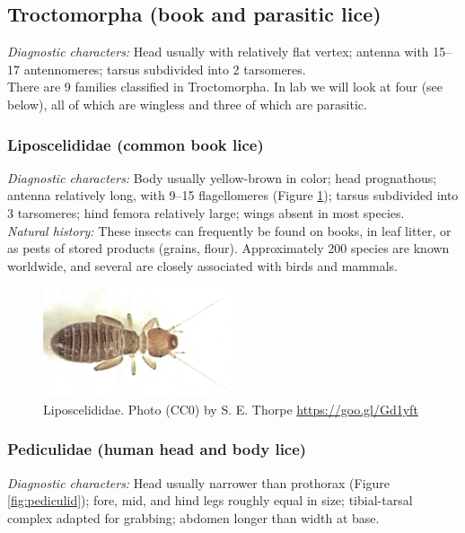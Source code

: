 \documentclass[letterpaper, 11pt]{article}
\begin{document}
\subsection{Troctomorpha (book and parasitic lice)}
\noindent{}\textit{Diagnostic characters:} Head usually with relatively flat vertex; antenna with 15--17 antennomeres; tarsus subdivided into 2 tarsomeres.\\

\noindent{}There are 9 families classified in Troctomorpha. In lab we will look at four (see below), all of which are wingless and three of which are parasitic.

\subsubsection{Liposcelididae (common book lice)}
\noindent{}\textit{Diagnostic characters:} Body usually yellow-brown in color; head prognathous; antenna relatively long, with 9--15 flagellomeres (Figure \ref{fig:liposcelidid}); tarsus subdivided into 3 tarsomeres; hind femora relatively large; wings absent in most species.\\

\noindent{}\textit{Natural history:} These insects can frequently be found on books, in leaf litter, or as pests of stored products (grains, flour). Approximately 200 species are known worldwide, and several are closely associated with birds and mammals.\\

\begin{figure}[ht!]
 \centering
 \includegraphics[width=0.5\textwidth]{LiposcelididHabitus}
 \caption{Liposcelididae. Photo (CC0) by S. E. Thorpe \url{https://goo.gl/Gd1yft}}
 \label{fig:liposcelidid}
\end{figure}

\subsubsection{Pediculidae (human head and body lice)}
\noindent{}\textit{Diagnostic characters:} Head usually narrower than prothorax (Figure \ref{fig:pediculid}); fore, mid, and hind legs roughly equal in size; tibial-tarsal complex adapted for grabbing; abdomen longer than width at base.\\
\end{document}
